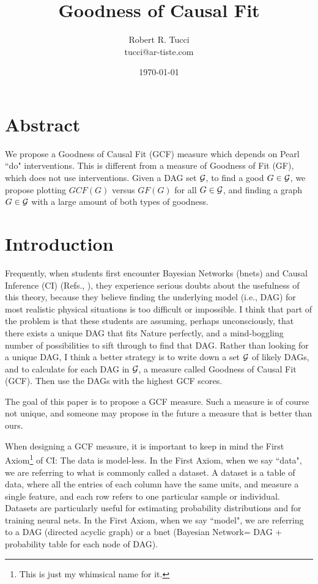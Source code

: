 \documentclass[12pt]{article}
\begin{document}
\title{Goodness of Causal Fit}
\date{ \today}
\author{Robert R. Tucci\\
        tucci@ar-tiste.com}
\maketitle
\vskip2cm
\section*{Abstract}
We propose a 
Goodness of Causal Fit (GCF) measure
which depends 
on Pearl ``do" interventions.
This is different
from a measure of Goodness of Fit (GF),
which does not use interventions.
Given a DAG set  ${\cal G}$,
to find a good $G\in {\cal G}$,
we propose plotting
$GCF(G)$ versus $GF(G)$
for all $G\in {\cal G}$,
and finding a 
graph $G\in {\cal G}$  with 
a large amount 
of both types of goodness.


\newpage
\section{Introduction}



Frequently,
when students
first encounter
Bayesian Networks (bnets)
and Causal Inference (CI)
(Refs.\cite{pearl-2013book},
\cite{bayesuvius}),
they experience serious doubts
about the usefulness of this
theory, because they believe
finding the underlying model 
(i.e., DAG)
for most realistic
 physical situations is
too difficult or impossible.
I think
that part of the problem
is that these students
are assuming, perhaps
unconsciously,
that there exists
a unique DAG
that fits Nature perfectly,
and a mind-boggling number
 of possibilities
to sift through to find that DAG.
Rather than looking
for a unique DAG,
I think a better strategy
is to write down
a set ${\cal G}$ 
of likely DAGs,
and to calculate for 
each DAG in ${\cal G}$,
 a measure called 
Goodness of Causal Fit (GCF).
Then use the DAGs with
the highest GCF scores.


The goal of this paper
is to propose a GCF measure.
Such a measure is of course
not unique,
and someone may propose 
in the future a measure that is better
than ours.

When designing a GCF measure,
it is important to keep
in mind the First Axiom\footnote{
This is just my whimsical name for it.} of CI: The data is model-less.
 In the First Axiom,
when we say ``data", we are referring to what is commonly
 called a dataset. A dataset is a table of data, where all
 the entries of each column have the same units, and 
measure a single feature, and each row refers to one
 particular sample or individual. Datasets are particularly 
useful for estimating probability distributions and for 
training neural nets. In the First Axiom, when we say ``model", we are 
referring to a DAG (directed acyclic graph) or a bnet
 (Bayesian Network= DAG + probability table 
for each node of DAG).
\end{document}
